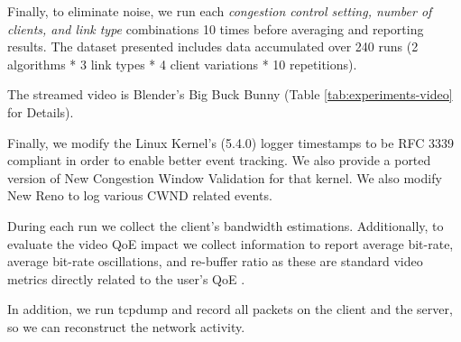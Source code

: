 \documentclass[10pt,sigconf]{acmart}
\begin{document}
Finally, to eliminate noise, we run each \textit{congestion control setting, number of clients, and link type} combinations 10 times before averaging and reporting results. The dataset presented includes data accumulated over 240 runs (2 algorithms * 3 link types * 4 client variations * 10 repetitions).

The streamed video is Blender's Big Buck Bunny \cite{online-bbb} (Table \ref{tab:experiments-video} for Details).

Finally, we modify the Linux Kernel's (5.4.0) logger timestamps to be RFC 3339 compliant in order to enable better event tracking. We also provide a ported version of New Congestion Window Validation \cite{rfc7661-2015-fairhurst-new-cwnd-validation} for that kernel. We also modify New Reno to log various CWND related events.

During each run we collect the client's bandwidth estimations. Additionally, to evaluate the video QoE impact we collect information to report average bit-rate, average bit-rate oscillations, and re-buffer ratio as these are standard video metrics directly related to the user's QoE \cite{Spiteri-2019-from-theory-to-practice-sabre, Yin-2015-a-control-theoritic-approach, Dobrian-2013-understanding-the-impact-of-video-quality}.

In addition, we run tcpdump and record all packets on the client and the server, so we can reconstruct the network activity.



\end{document}
